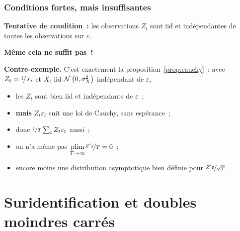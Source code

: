 \documentclass[10pt]{beamer}
\begin{document}
\begin{frame}
  \frametitle{Conditions fortes, mais insuffisantes}

  \textbf{Tentative de condition~:} les observations $Z_t$ sont iid et
  indépendantes de toutes les observations sur $\varepsilon$.

  \bigskip

  \textbf{Même cela ne suffit pas~!}

  \bigskip

  \textbf{Contre-exemple.} C'est exactement la proposition~\ref{prop:cauchy}~:
  avec $Z_t = \nicefrac{1}{X_t}$ et $X_t$ iid $\mathcal N\left(0,\sigma_X^2\right)$
  indépendant de $\varepsilon$,

  \begin{itemize}
  \item les $Z_t$ sont bien iid et indépendants de $\varepsilon$~;
  \item \textbf{mais} $Z_t\varepsilon_t$ suit une loi de Cauchy, sans espérance~;
  \item donc $\nicefrac{1}{T}\sum_t Z_t\varepsilon_t$ aussi~;
  \item on n'a même pas
    $\underset{T\rightarrow\infty}{\text{plim}}\nicefrac{Z'\varepsilon}{T} = 0$~;
  \item encore moins une distribution asymptotique bien définie
    pour $\nicefrac{Z'\varepsilon}{\sqrt{T}}$.
  \end{itemize}

\end{frame}


\section{Suridentification et doubles moindres carrés}
\end{document}
